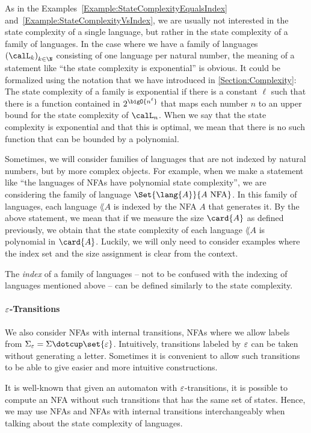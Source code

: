 \documentclass[../../diss.tex]{subfiles}
\begin{document}
As in the Examples~\ref{Example:StateComplexityEqualsIndex} and~\ref{Example:StateComplexityVsIndex}, we are usually not interested in the state complexity of a single language, but rather in the state complexity of a family of languages.
In the case where we have a family of languages ${(\calL_k)}_{k \in \N}$ consisting of one language per natural number, the meaning of a statement like \enquote{the state complexity is exponential} is obvious.
It could be formalized using the notation that we have introduced in \cref{Section:Complexity}: The state complexity of a family is exponential if there is a constant $\ell$ such that there is a function contained in $2^{\bigO{n^\ell}}$ that maps each number $n$ to an upper bound for the state complexity of $\calL_n$.
When we say that the state complexity is exponential and that this is optimal, we mean that there is no such function that can be bounded by a polynomial.

Sometimes, we will consider families of languages that are not indexed by natural numbers, but by more complex objects.
For example, when we make a statement like \enquote{the languages of NFAs have polynomial state complexity}, we are considering the family of language $\Set{ \lang{A} }{ A \text{ NFA}}$.
In this family of languages, each language $\lang{A}$ is indexed by the NFA $A$ that generates it.
By the above statement, we mean that if we measure the size $\card{A}$ as defined previously, we obtain that the state complexity of each language $\lang{A}$ is polynomial in $\card{A}$.
Luckily, we will only need to consider examples where the index set and the size assignment is clear from the context.

The \emph{index} of a family of languages -- not to be confused with the indexing of languages mentioned above -- can be defined similarly to the state complexity.

\paragraph{$\varepsilon$-Transitions}

We also consider NFAs with internal transitions, \ie NFAs where we allow labels from $\Sigma_\eps = \Sigma \dotcup \set{\eps}$.
Intuitively, transitions labeled by $\varepsilon$ can be taken without generating a letter.
Sometimes it is convenient to allow such transitions to be able to give easier and more intuitive constructions.

It is well-known that given an automaton with $\varepsilon$-transitions, it is possible to compute an NFA without such transitions that has the same set of states.
Hence, we may use NFAs and NFAs with internal transitions interchangeably when talking about the state complexity of languages.
\end{document}
